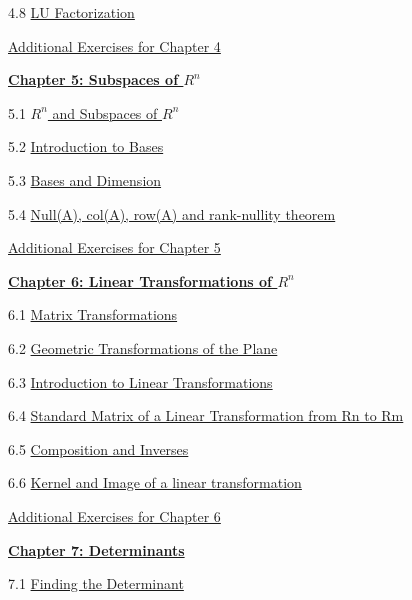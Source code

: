 \documentclass{ximera}
\begin{document}
4.8	\href{https://ximera.osu.edu/oerlinalg/LinearAlgebra/MAT-0070/main}{LU Factorization}
	
\href{https://ximera.osu.edu/oerlinalg/LinearAlgebra/SUPX-0040/main}{Additional Exercises for Chapter 4}
	
\href{https://ximera.osu.edu/oerlinalg/LinearAlgebra/XLAChapter_subspacesRn/main}{\textbf{Chapter 5: Subspaces of $R^n$}}
	
5.1	\href{https://ximera.osu.edu/oerlinalg/LinearAlgebra/VSP-0020/main}{$R^n$ and Subspaces of $R^n$}
	
5.2	\href{https://ximera.osu.edu/oerlinalg/LinearAlgebra/VSP-0030/main}{Introduction to Bases}
	
5.3	\href{https://ximera.osu.edu/oerlinalg/LinearAlgebra/VSP-0035/main}{Bases and Dimension}
	
5.4	\href{https://ximera.osu.edu/oerlinalg/LinearAlgebra/VSP-0040/main}{Null(A), col(A), row(A) and rank-nullity theorem}
	
\href{https://ximera.osu.edu/oerlinalg/LinearAlgebra/SUPX-0050/main}{Additional Exercises for Chapter 5}
	
\href{https://ximera.osu.edu/oerlinalg/LinearAlgebra/XLAChapter_linTrans/main}{\textbf{Chapter 6: Linear Transformations of $R^n$}}
	
6.1	\href{https://ximera.osu.edu/oerlinalg/LinearAlgebra/LTR-0005/main}{Matrix Transformations}
	
6.2	\href{https://ximera.osu.edu/oerlinalg/LinearAlgebra/LTR-0070/main}{Geometric Transformations of the Plane}
	
6.3	\href{https://ximera.osu.edu/oerlinalg/LinearAlgebra/LTR-0010/main}{Introduction to Linear Transformations}
	
6.4	\href{https://ximera.osu.edu/oerlinalg/LinearAlgebra/LTR-0020/main}{Standard Matrix of a Linear Transformation from Rn to Rm}
	
6.5	\href{https://ximera.osu.edu/oerlinalg/LinearAlgebra/LTR-0030/main}{Composition and Inverses}
	
6.6	\href{https://ximera.osu.edu/oerlinalg/LinearAlgebra/LTR-0050/main}{Kernel and Image of a linear transformation}
	
\href{https://ximera.osu.edu/oerlinalg/LinearAlgebra/SUPX-0060/main}{Additional Exercises for Chapter 6}
	
\href{https://ximera.osu.edu/oerlinalg/LinearAlgebra/XLAChapter_det/main}{\textbf{Chapter 7: Determinants}}
	
7.1	\href{https://ximera.osu.edu/oerlinalg/LinearAlgebra/DET-0010/main}{Finding the Determinant}
	
\end{document}
